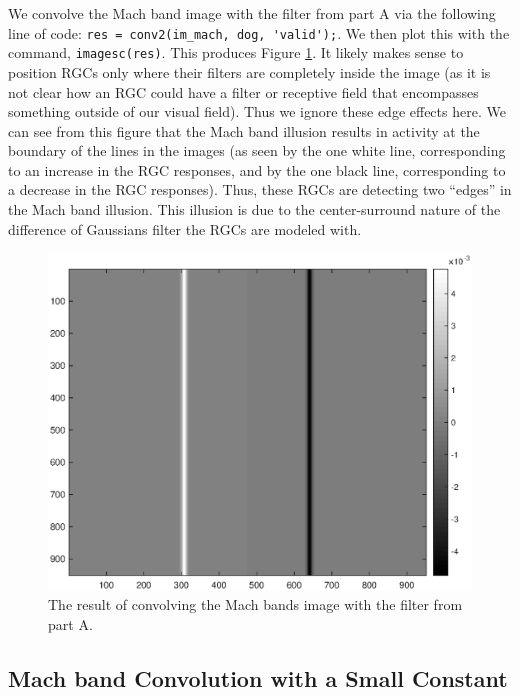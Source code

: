 \documentclass[11pt, oneside]{article}
\begin{document}
We convolve the Mach band image with the filter from part A via the following line of code: \lstinline{res = conv2(im_mach, dog, 'valid');}. We then plot this with the command, \lstinline{imagesc(res)}. This produces Figure \ref{fig:machConv}. It likely makes sense to position RGCs only where their filters are completely inside the image (as it is not clear how an RGC could have a filter or receptive field that encompasses something outside of our visual field). Thus we ignore these edge effects here. We can see from this figure that the Mach band illusion results in activity at the boundary of the lines in the images (as seen by the one white line, corresponding to an increase in the RGC responses, and by the one black line, corresponding to a decrease in the RGC responses). Thus, these RGCs are detecting two ``edges'' in the Mach band illusion. This illusion is due to the center-surround nature of the difference of Gaussians filter the RGCs are modeled with.

\begin{figure}[ht!]
\includegraphics[width=1\textwidth]{mach_dog_conv.eps}
\caption{The result of convolving the Mach bands image with the filter from part A.}
\label{fig:machConv}
\end{figure}

\subsection{Mach band Convolution with a Small Constant}
\end{document}
